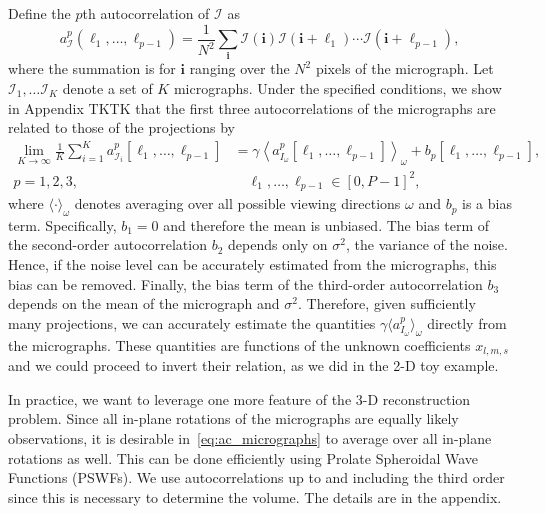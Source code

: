 \documentclass[english,11pt]{article}
\newcommand{\1}{\mathbf{1}}
\newcommand{\II}{\mathcal{I}}
\newcommand{\mb}{\mathbf}
\newcommand*\Bell{\ensuremath{\boldsymbol\ell}}
\newcommand{\TODO}[1]{{\color{red}{[#1]}}}
\numberwithin{equation}{section}
\theoremstyle{plain}
\theoremstyle{definition}
\theoremstyle{remark}
\theoremstyle{plain}
\theoremstyle{remark}
\theoremstyle{plain}
\theoremstyle{plain}
\newcommand{\tamir}{x}
\begin{document}
Define the $p$th autocorrelation of $\II$ as
\begin{equation*} \label{eq:Kth_autocorrelation}
a^p_\II(\Bell_1,\ldots, \Bell_{p-1}) = \frac{1}{N^2}\sum_{\mb i}\II(\mb i)\II(\mb i+\Bell_1)\cdots \II(\mb i+\Bell_{p-1}),
\end{equation*}
where the summation is for $\mb i $ ranging over the $N^2$  pixels of the micrograph. %
Let $\II_1,\ldots\II_K$ denote a set of $K$ micrographs. 
Under the specified conditions, we show in Appendix TKTK that the first three autocorrelations  of the micrographs are related to those of the projections by \begin{align} \label{eq:ac_micrographs}
\lim_{K\to\infty}\frac{1}{K}\sum_{i=1}^Ka^p_{\II_i}[\Bell_1,\ldots,\Bell_{p-1}]  &= \gamma\left\langle a^p_{I_\omega}[\Bell_1,\ldots,\Bell_{p-1}]\right\rangle_{\omega} + b_p[\Bell_1,\ldots,\Bell_{p-1}], \\ p=1,2,3,& \quad \Bell_1,\ldots,\Bell_{p-1}\in[0,P-1]^2, \nonumber
\end{align}
where $\langle\cdot\rangle_\omega$ denotes averaging over all possible viewing directions $\omega$ and $b_p$ is a bias term. %
Specifically,  $b_1 = 0$ and therefore the mean is unbiased. The bias term of the second-order autocorrelation  $b_2$ depends only on $\sigma^2$, the variance of the noise. Hence, if the noise level can be accurately estimated from the micrographs, this bias can be removed. 
Finally, the bias term of the third-order autocorrelation $b_3$ depends on the mean of the micrograph and $\sigma^2$.  Therefore, given sufficiently many projections, we can accurately estimate the quantities $\gamma\langle a^p_{I_{\omega}}\rangle_{\omega}$ directly from the micrographs. These quantities are functions of the unknown coefficients $\tamir_{l,m,s}$ and we could proceed to invert their relation, as we did in the 2-D toy example. 

In practice, we want to leverage one more feature of the 3-D reconstruction problem.
Since all in-plane rotations of the micrographs are equally likely observations, 
it is desirable in~\eqref{eq:ac_micrographs} to average over all in-plane rotations as well.
This can be done efficiently using Prolate Spheroidal Wave Functions (PSWFs).  We use autocorrelations up to and including the  third order since this is necessary to  determine the volume.
The details are in the appendix. 
\end{document}
